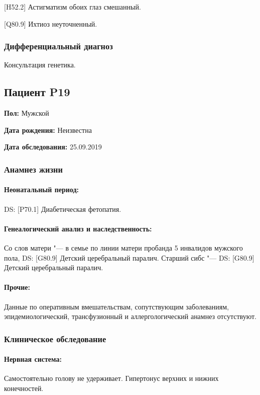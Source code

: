 \documentclass[a4paper,14pt]{extarticle}
\newcommand{\DS}[2]{[#2] #1}
\begin{document}
\DS{Астигматизм обоих глаз смешанный}{H52.2}. 

\DS{Ихтиоз неуточненный}{Q80.9}.

\subsubsection*{Дифференциальный диагноз}

Консультация генетика.

\newpage
\subsection*{Пациент P19}

\textbf{Пол:} Мужской

\textbf{Дата рождения:} Неизвестна

\textbf{Дата обследования:} 25.09.2019

\subsubsection*{Анамнез жизни}

\paragraph{Неонатальный период:} DS: \DS{Диабетическая фетопатия}{P70.1}.

\paragraph{Генеалогический анализ и наследственность:} Со слов матери "--- в семье по линии матери пробанда 5 инвалидов мужского пола, DS: \DS{Детский церебральный паралич}{G80.9}. Старший сибс "--- DS: \DS{Детский церебральный паралич}{G80.9}.

\paragraph{Прочие:} Данные по оперативным вмешательствам, сопутствующим заболеваниям, эпидемиологический, трансфузионный и аллергологический анамнез отсутствуют.

\subsubsection*{Клиническое обследование}

\paragraph{Нервная система:} Самостоятельно голову не удерживает. Гипертонус верхних и нижних конечностей.
\end{document}
